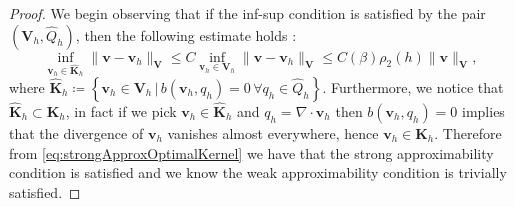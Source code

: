 \documentclass[USenglish]{article}
\theoremstyle{dgthm}
\theoremstyle{dgdef}
\let\vec\bm
\newcommand\norm[1]{\lVert#1\rVert}
\begin{document}
\begin{proof}
  We begin observing that if the inf-sup condition is satisfied by the pair $(\vec{V}_h,\hat{Q}_h)$, then the following estimate holds \cite[Proposition 5.1.3]{BBF}:
  \begin{equation}
    \underset{\vec{v}_h\in \hat{\vec{K}}_h}{\inf}\norm{\vec{v}-\vec{v}_h}_{\vec{V}}\leq C \underset{\vec{v}_h\in \vec{V}_h}{\inf}\norm{\vec{v}-\vec{v}_h}_{\vec{V}}\leq C(\beta)\rho_2(h)\norm{\vec{v}}_{\vec{V}},\label{eq:strongApproxOptimalKernel}
  \end{equation}
  where $\hat{\vec{K}}_h\coloneqq \left\{\vec{v}_h\in \vec{V}_h\,|\, b(\vec{v}_h,q_h)=0\, \forall q_h\in \hat{Q}_h\right\}$.
  Furthermore, we notice that $\hat{\vec{K}}_h\subset \vec{K}_h$, in fact if we pick $\vec{v}_h\in \hat{\vec{K}}_h$ and $q_h = \nabla\cdot \vec{v}_h$ then $b(\vec{v}_h,q_h)=0$ implies that the divergence of $\vec{v}_h$ vanishes almost everywhere, hence $\vec{v}_h\in \vec{K}_h$.
  Therefore from \eqref{eq:strongApproxOptimalKernel} we have that the strong approximability condition is satisfied and we know the weak approximability condition is trivially satisfied.
\end{proof}
\end{document}
